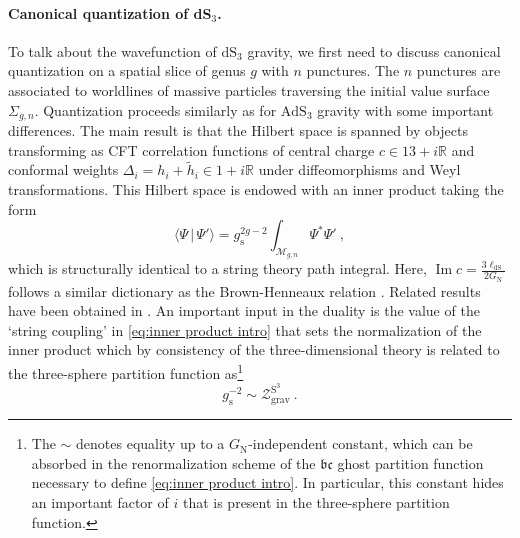\documentclass[12pt,a4paper]{article}
\newcommand{\be}{\begin{equation}}
\newcommand{\ee}{\end{equation}}
\renewcommand\Im{\mathop{\text{Im}}}
\newcommand\RR{\mathbb{R}}
\begin{document}
\paragraph{Canonical quantization of dS$_3$.} To talk about the wavefunction of $\mathrm{dS}_3$ gravity, we first need to discuss canonical quantization on a spatial slice of genus $g$ with $n$ punctures. The $n$ punctures are associated to worldlines of massive particles traversing the initial value surface $\Sigma_{g,n}$. Quantization proceeds similarly as for $\mathrm{AdS}_3$ gravity with some important differences.
The main result is that the Hilbert space is spanned by objects transforming as CFT correlation functions of central charge $c \in 13+i \RR$ and conformal weights $\Delta_i=h_i+\tilde{h}_i \in 1+i \RR$ under diffeomorphisms and Weyl transformations. This Hilbert space is endowed with an inner product taking the form 
\be 
\langle \Psi \, |\, \Psi' \rangle=g_\text{s}^{2g-2} \int_{\mathcal{M}_{g,n}} \Psi^* \Psi'~ , \label{eq:inner product intro}
\ee
which is structurally identical to a string theory path integral. Here, $\Im c=\frac{3 \ell_\text{dS}}{2 G_\text{N}}$ follows a similar dictionary as the Brown-Henneaux relation \cite{Brown:1986nw}. Related results have been obtained in \cite{Castro:2012gc, Verlinde:2024zrh, Gaiotto:2024osr,Godet:2024ich,Chakraborty:2023los}. An important input in the duality is the value of the `string coupling' in \eqref{eq:inner product intro} that sets the normalization of the inner product which by consistency of the three-dimensional theory is related to the three-sphere partition function as\footnote{The $\sim$ denotes equality up to a $G_\text{N}$-independent constant, which can be absorbed in the renormalization scheme of the $\mathfrak{b}\mathfrak{c}$ ghost partition function necessary to define \eqref{eq:inner product intro}. In particular, this constant hides an important factor of $i$ that is present in the three-sphere partition function.}
\be 
g_\text{s}^{-2} \sim \mathcal{Z}_\text{grav}^{\mathrm{S}^3}~. \label{eq:intro gstring ZS3}
\ee
\end{document}
